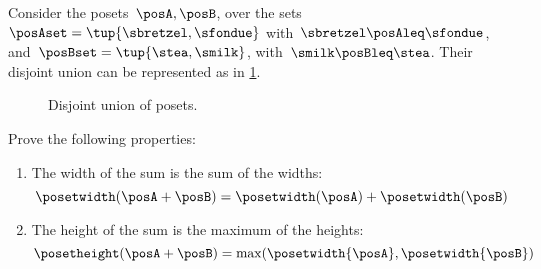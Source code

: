 \begin{example}
    Consider the posets~$\posA,\posB$, over the sets~$\posAset=\tup{\sbretzel, \sfondue}$ with~$\sbretzel \posAleq \sfondue$, and~$\posBset=\tup{\stea,\smilk}$, with~$\smilk \posBleq \stea$.
    Their disjoint union can be represented as in \cref{fig:poset-coproduct}.

    \begin{figure}[h!]
        \centering
        \caption{Disjoint union of posets.}
        \label{fig:poset-coproduct}
    \end{figure}
\end{example}
\vfill
\begin{gradedexercise}
    Prove the following properties:
    \begin{enumerate}
        \item The width of the sum is the sum of the widths:
              \begin{equation}
                  \posetwidth(\posA + \posB) = \posetwidth(\posA) + \posetwidth(\posB)
              \end{equation}
        \item The height of the sum is the maximum of the heights:
              \begin{equation}
                  \posetheight(\posA + \posB) = \max(\posetwidth{\posA}, \posetwidth{\posB})
              \end{equation}
    \end{enumerate}
\end{gradedexercise}
